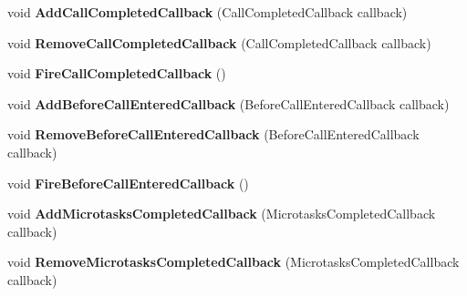 \begin{DoxyCompactItemize}
\item 
void {\bfseries Add\+Call\+Completed\+Callback} (Call\+Completed\+Callback callback)\hypertarget{classv8_1_1internal_1_1_isolate_ab1e71528cbb0b79d44eb2dbc0a03c38b}{}\label{classv8_1_1internal_1_1_isolate_ab1e71528cbb0b79d44eb2dbc0a03c38b}

\item 
void {\bfseries Remove\+Call\+Completed\+Callback} (Call\+Completed\+Callback callback)\hypertarget{classv8_1_1internal_1_1_isolate_a556b9cd41f26acd9577405a459d794c0}{}\label{classv8_1_1internal_1_1_isolate_a556b9cd41f26acd9577405a459d794c0}

\item 
void {\bfseries Fire\+Call\+Completed\+Callback} ()\hypertarget{classv8_1_1internal_1_1_isolate_a967a40b2fbb51dc3a14529f7a501c9bc}{}\label{classv8_1_1internal_1_1_isolate_a967a40b2fbb51dc3a14529f7a501c9bc}

\item 
void {\bfseries Add\+Before\+Call\+Entered\+Callback} (Before\+Call\+Entered\+Callback callback)\hypertarget{classv8_1_1internal_1_1_isolate_a7f21dd859aac43aead8637649942e2fd}{}\label{classv8_1_1internal_1_1_isolate_a7f21dd859aac43aead8637649942e2fd}

\item 
void {\bfseries Remove\+Before\+Call\+Entered\+Callback} (Before\+Call\+Entered\+Callback callback)\hypertarget{classv8_1_1internal_1_1_isolate_abca2a202db6ee0491435b7d4dc936b8a}{}\label{classv8_1_1internal_1_1_isolate_abca2a202db6ee0491435b7d4dc936b8a}

\item 
void {\bfseries Fire\+Before\+Call\+Entered\+Callback} ()\hypertarget{classv8_1_1internal_1_1_isolate_a117db1173c639b720077581078188152}{}\label{classv8_1_1internal_1_1_isolate_a117db1173c639b720077581078188152}

\item 
void {\bfseries Add\+Microtasks\+Completed\+Callback} (Microtasks\+Completed\+Callback callback)\hypertarget{classv8_1_1internal_1_1_isolate_a066e5b7f6dca46db4fad09cf59a23765}{}\label{classv8_1_1internal_1_1_isolate_a066e5b7f6dca46db4fad09cf59a23765}

\item 
void {\bfseries Remove\+Microtasks\+Completed\+Callback} (Microtasks\+Completed\+Callback callback)\hypertarget{classv8_1_1internal_1_1_isolate_a1029a2cfee07a98151c85dc14730278c}{}\label{classv8_1_1internal_1_1_isolate_a1029a2cfee07a98151c85dc14730278c}


\end{DoxyCompactItemize}

